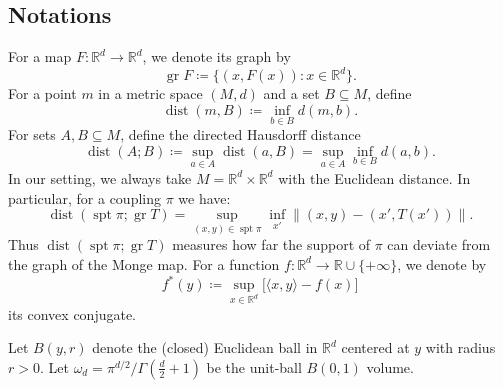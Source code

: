 \documentclass{article}
\theoremstyle{plain}
\theoremstyle{definition}
\theoremstyle{remark}
\numberwithin{equation}{section}
\DeclareMathOperator{\spt}{spt}
\DeclareMathOperator{\gr}{gr}
\DeclareMathOperator{\dist}{dist}
\newcommand{\R}{\mathbb{R}}
\begin{document}
\subsection{Notations}
For a map $F:\R^d\to\R^d$, we denote its graph by
$$
\gr F\coloneqq\{(x,F(x)):x\in\R^d\}.
$$
For a point $m$ in a metric space $(M,d)$ and a set $B\subseteq M$, define
$$
\dist(m,B)\coloneqq \inf_{b\in B}d(m,b).
$$
For sets $A,B\subseteq M$, define the directed Hausdorff distance
$$
\dist(A;B)\coloneqq\sup_{a\in A}\dist(a,B)=\sup_{a\in A}\inf_{b\in B}d(a,b).
$$
In our setting, we always take $M=\R^d\times\R^d$ with the Euclidean distance.
In particular, for a coupling $\pi$ we have:
$$
\dist(\spt\pi;\gr T)=\sup_{(x,y)\in\spt\pi}\inf_{x'}\big\|(x,y)-(x',T(x'))\big\|.
$$
Thus $\dist(\spt\pi;\gr T)$ measures how far the support of $\pi$ can deviate from the graph of the Monge map.
For a function $f:\R^d\to\R\cup\{+\infty\}$, we denote by
$$
f^*(y)\coloneqq\sup_{x\in\R^d}\bigl[\langle x,y\rangle-f(x)\bigr]
$$
its convex conjugate.

Let $B(y,r)$ denote the (closed) Euclidean ball in $\R^d$ centered at $y$ with radius $r>0$. Let $\omega_d=\pi^{d/2}/\Gamma(\frac d2+1)$ be the unit-ball $B(0,1)$ volume.
\end{document}
